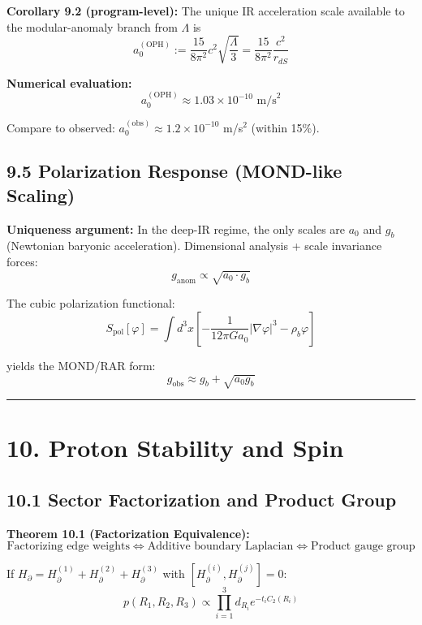 \textbf{Corollary 9.2 (program-level):} The unique IR acceleration scale available to the modular-anomaly branch from \(\Lambda\) is \[a_0^{(\text{OPH})} := \frac{15}{8\pi^2} c^2 \sqrt{\frac{\Lambda}{3}} = \frac{15}{8\pi^2} \frac{c^2}{r_{dS}}\]

\textbf{Numerical evaluation:} \[a_0^{(\text{OPH})} \approx 1.03 \times 10^{-10} \text{ m/s}^2\]

Compare to observed: \(a_0^{(\text{obs})} \approx 1.2 \times 10^{-10}\) m/s\(^2\) (within 15\%).

\subsection{9.5 Polarization Response (MOND-like Scaling)}\label{95-polarization-response-mond-like-scaling}

\textbf{Uniqueness argument:} In the deep-IR regime, the only scales are \(a_0\) and \(g_b\) (Newtonian baryonic acceleration). Dimensional analysis + scale invariance forces: \[g_{\text{anom}} \propto \sqrt{a_0 \cdot g_b}\]

The cubic polarization functional: \[S_{\text{pol}}[\varphi] = \int d^3x \left[-\frac{1}{12\pi G a_0}|\nabla\varphi|^3 - \rho_b \varphi\right]\]

yields the MOND/RAR form: \[g_{\text{obs}} \approx g_b + \sqrt{a_0 g_b}\]

\begin{center}\rule{0.5\linewidth}{0.5pt}\end{center}

\section{10. Proton Stability and Spin}\label{10-proton-stability-and-spin}

\subsection{10.1 Sector Factorization and Product Group}\label{101-sector-factorization-and-product-group}

\textbf{Theorem 10.1 (Factorization Equivalence):} \[\text{Factorizing edge weights} \Leftrightarrow \text{Additive boundary Laplacian} \Leftrightarrow \text{Product gauge group}\]

If \(H_\partial = H_\partial^{(1)} + H_\partial^{(2)} + H_\partial^{(3)}\) with \([H_\partial^{(i)}, H_\partial^{(j)}] = 0\): \[p(R_1, R_2, R_3) \propto \prod_{i=1}^3 d_{R_i} e^{-t_i C_2(R_i)}\]


